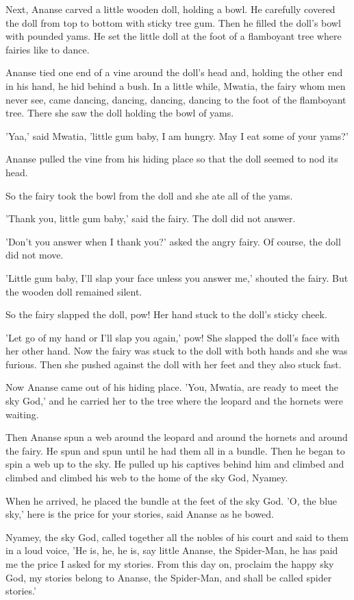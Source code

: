 Next, Ananse carved a little wooden doll, holding a bowl. He carefully covered the doll from top to bottom with sticky tree gum. Then he filled the doll's bowl with pounded yams. He set the little doll at the foot of a flamboyant tree where fairies like to dance.

Ananse tied one end of a vine around the doll's head and, holding the other end in his hand, he hid behind a bush. In a little while, Mwatia, the fairy whom men never see, came dancing, dancing, dancing, dancing to the foot of the flamboyant tree. There she saw the doll holding the bowl of yams.

'Yaa,' said Mwatia, 'little gum baby, I am hungry. May I eat some of your yams?'

Ananse pulled the vine from his hiding place so that the doll seemed to nod its head.

So the fairy took the bowl from the doll and she ate all of the yams.

'Thank you, little gum baby,' said the fairy. The doll did not answer.

'Don't you answer when I thank you?' asked the angry fairy. Of course, the doll did not move.

'Little gum baby, I'll slap your face unless you answer me,' shouted the fairy. But the wooden doll remained silent.

So the fairy slapped the doll, pow! Her hand stuck to the doll's sticky cheek.

'Let go of my hand or I'll slap you again,' pow! She slapped the doll's face with her other hand. Now the fairy was stuck to the doll with both hands and she was furious. Then she pushed against the doll with her feet and they also stuck fast.

Now Ananse came out of his hiding place. 'You, Mwatia, are ready to meet the sky God,' and he carried her to the tree where the leopard and the hornets were waiting.

Then Ananse spun a web around the leopard and around the hornets and around the fairy. He spun and spun until he had them all in a bundle. Then he began to spin a web up to the sky. He pulled up his captives behind him and climbed and climbed and climbed his web to the home of the sky God, Nyamey.

When he arrived, he placed the bundle at the feet of the sky God. 'O, the blue sky,' here is the price for your stories, said Ananse as he bowed.

Nyamey, the sky God, called together all the nobles of his court and said to them in a loud voice, 'He is, he, he is, say little Ananse, the Spider-Man, he has paid me the price I asked for my stories. From this day on, proclaim the happy sky God, my stories belong to Ananse, the Spider-Man, and shall be called spider stories.'

